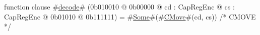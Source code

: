 function clause #\hyperref[zdecode]{decode}# (0b010010 @ 0b00000 @ cd : CapRegEnc @ cs : CapRegEnc @    0b01010 @ 0b111111) = #\hyperref[zSome]{Some}#(#\hyperref[zCMove]{CMove}#(cd, cs)) /* CMOVE */
